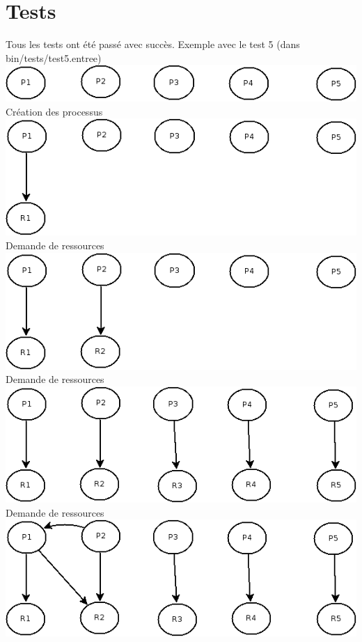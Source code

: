 \documentclass{article}
\begin{document}
\section{Tests}
Tous les tests ont été passé avec succès. Exemple avec le test 5 (dans bin/tests/test5.entree)\\
\includegraphics[scale=0.5]{images/test1}\\
Création des processus\\
\includegraphics[scale=0.5]{images/test2}\\
Demande de ressources\\
\includegraphics[scale=0.5]{images/test3}\\
Demande de ressources\\
\includegraphics[scale=0.5]{images/test4}\\
Demande de ressources\\
\includegraphics[scale=0.5]{images/test5}\\
\end{document}
